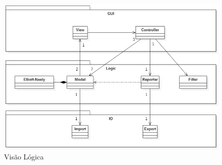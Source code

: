 \documentclass[12pt]{article}
\begin{document}
\begin{figure}[H]
	\centering
	\includegraphics[width=\textwidth]{LogicView.png}
	\caption{Visão Lógica}\label{fig:LogicView}
\end{figure}
\end{document}
